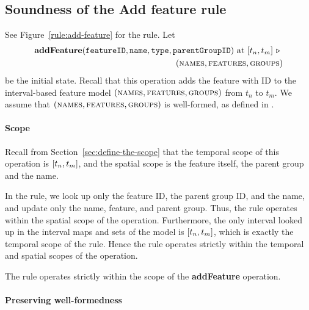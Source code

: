 \subsection{Soundness of the Add feature rule}
\label{sub:soundness-of-the-add-feature-rule}

See Figure~\vref{rule:add-feature} for the  rule.
Let 
\begin{equation*}
   \begin{split}
      \textbf{addFeature}(\var{featureID}, \var{name}, \var{type}, \var{parentGroupID})\text{ at }\interval{t_n}{t_m}
      \shove \\
   (\names{}, \features{}, \groups{})
\end{split}
\end{equation*}
be the initial state. Recall that this operation adds the feature with ID  to the interval-based feature model $(\textsc{names}{}, \textsc{features}{}, \textsc{groups}{}{})$ from $t_n$ to $t_m$. We assume that $(\textsc{names}{}, \textsc{features}{}, \textsc{groups}{}{})$ is well-formed, as defined in .


\paragraph{Scope}

Recall from Section~\vref{sec:define-the-scope} that the temporal scope of this operation is $\interval{t_n}{t_m}$, and the spatial scope is the feature itself, the parent group and the name. 

In the rule, we look up only the feature ID, the parent group ID, and the name, and update only the name, feature, and parent group. Thus, the rule operates within the spatial scope of the operation. Furthermore, the only interval looked up in the interval maps and sets of the model is $\interval{t_n}{t_m}$, which is exactly the temporal scope of the rule. Hence the rule operates strictly within the temporal and spatial scopes of the operation.
\\

\begin{lemma}
   The  rule operates strictly within the scope of the \textbf{addFeature} operation.
   \label{lemma:add-feature-scope}
\end{lemma}


\paragraph{Preserving well-formedness}


